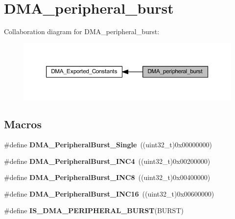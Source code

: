 \hypertarget{group___d_m_a__peripheral__burst}{}\section{D\+M\+A\+\_\+peripheral\+\_\+burst}
\label{group___d_m_a__peripheral__burst}
Collaboration diagram for D\+M\+A\+\_\+peripheral\+\_\+burst\+:
\nopagebreak
\begin{figure}[H]
\begin{center}
\leavevmode
\includegraphics[width=350pt]{group___d_m_a__peripheral__burst}
\end{center}
\end{figure}
\subsection*{Macros}
\begin{DoxyCompactItemize}
\item 
\mbox{\label{group___d_m_a__peripheral__burst_ga524cdc5efb8978b586637f35e38a850b}} 
\#define {\bfseries D\+M\+A\+\_\+\+Peripheral\+Burst\+\_\+\+Single}~((uint32\+\_\+t)0x00000000)
\item 
\mbox{\label{group___d_m_a__peripheral__burst_gaa8eba5161b3927f1ffb81157f3e39b71}} 
\#define {\bfseries D\+M\+A\+\_\+\+Peripheral\+Burst\+\_\+\+I\+N\+C4}~((uint32\+\_\+t)0x00200000)
\item 
\mbox{\label{group___d_m_a__peripheral__burst_gaf04ba122268e0f54085ca8e45410fe69}} 
\#define {\bfseries D\+M\+A\+\_\+\+Peripheral\+Burst\+\_\+\+I\+N\+C8}~((uint32\+\_\+t)0x00400000)
\item 
\mbox{\label{group___d_m_a__peripheral__burst_ga04ff56ff0a2a5470fc2c4817be4213c2}} 
\#define {\bfseries D\+M\+A\+\_\+\+Peripheral\+Burst\+\_\+\+I\+N\+C16}~((uint32\+\_\+t)0x00600000)
\item 
\#define {\bfseries I\+S\+\_\+\+D\+M\+A\+\_\+\+P\+E\+R\+I\+P\+H\+E\+R\+A\+L\+\_\+\+B\+U\+R\+ST}(B\+U\+R\+ST)
\end{DoxyCompactItemize}



